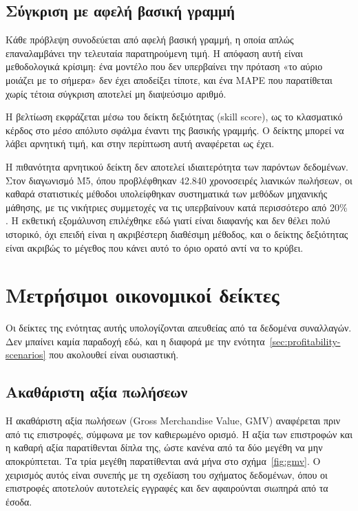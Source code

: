 \subsection{Σύγκριση με αφελή βασική γραμμή}

Κάθε πρόβλεψη συνοδεύεται από αφελή βασική γραμμή, η οποία απλώς επαναλαμβάνει
την τελευταία παρατηρούμενη τιμή. Η απόφαση αυτή είναι μεθοδολογικά κρίσιμη:
ένα μοντέλο που δεν υπερβαίνει την πρόταση «το αύριο μοιάζει με το σήμερα» δεν
έχει αποδείξει τίποτε, και ένα \textenglish{MAPE} που παρατίθεται χωρίς τέτοια
σύγκριση αποτελεί μη διαψεύσιμο αριθμό.

Η βελτίωση εκφράζεται μέσω του δείκτη δεξιότητας
(\textenglish{skill score}), ως το κλασματικό κέρδος στο μέσο απόλυτο σφάλμα
έναντι της βασικής γραμμής. Ο δείκτης μπορεί να λάβει αρνητική τιμή, και στην
περίπτωση αυτή αναφέρεται ως έχει.

Η πιθανότητα αρνητικού δείκτη δεν αποτελεί ιδιαιτερότητα των παρόντων
δεδομένων. Στον διαγωνισμό \textenglish{M5}, όπου προβλέφθηκαν 42.840 χρονοσειρές
λιανικών πωλήσεων, οι καθαρά στατιστικές μέθοδοι υπολείφθηκαν συστηματικά των
μεθόδων μηχανικής μάθησης, με τις νικήτριες συμμετοχές να τις υπερβαίνουν κατά
περισσότερο από 20\% \cite{makridakis2022m5}. Η εκθετική εξομάλυνση
επιλέχθηκε εδώ γιατί είναι διαφανής και δεν θέλει πολύ ιστορικό, όχι επειδή
είναι η ακριβέστερη διαθέσιμη μέθοδος, και ο δείκτης δεξιότητας είναι ακριβώς
το μέγεθος που κάνει αυτό το όριο ορατό αντί να το κρύβει.

\section{Μετρήσιμοι οικονομικοί δείκτες}
\label{sec:measured-economics}

Οι δείκτες της ενότητας αυτής υπολογίζονται απευθείας από τα δεδομένα
συναλλαγών. Δεν μπαίνει καμία παραδοχή εδώ, και η διαφορά με την
ενότητα~\ref{sec:profitability-scenarios} που ακολουθεί είναι ουσιαστική.

\subsection{Ακαθάριστη αξία πωλήσεων}

Η ακαθάριστη αξία πωλήσεων (\textenglish{Gross Merchandise Value, GMV})
αναφέρεται πριν από τις επιστροφές, σύμφωνα με τον καθιερωμένο ορισμό. Η αξία
των επιστροφών και η καθαρή αξία παρατίθενται δίπλα της, ώστε κανένα από τα
δύο μεγέθη να μην αποκρύπτεται. Τα τρία μεγέθη παρατίθενται ανά μήνα στο
σχήμα~\ref{fig:gmv}. Ο χειρισμός αυτός είναι συνεπής με τη σχεδίαση
του σχήματος δεδομένων, όπου οι επιστροφές αποτελούν αυτοτελείς εγγραφές και
δεν αφαιρούνται σιωπηρά από τα έσοδα.

